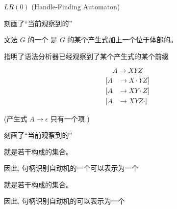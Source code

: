 \begin{frame}{}
  \begin{center}
    $LR(0)$  (Handle-Finding Automaton)

    \vspace{0.10cm}
  \end{center}
\end{frame}

\begin{frame}{}
  \begin{center}
    刻画了``当前观察到的''
  \end{center}

  \begin{definition}[$LR(0)$项 (Item)]
    文法 $G$ 的一个 是 $G$ 的某个产生式加上一个位于体部的。
  \end{definition}

  \begin{center}
    指明了语法分析器已经观察到了某个产生式的某个前缀

    \pause
    \[
      A \to XYZ
    \]
    \begin{align*}
      [A &\to \cdot XYZ] \\[6pt]
      [A &\to X \cdot YZ] \\[6pt]
      [A &\to XY \cdot Z] \\[6pt]
      [A &\to XYZ \cdot]
    \end{align*}

    (产生式 $A \to \epsilon$ 只有一个项 \blue{$[A \to \cdot]$})
  \end{center}
\end{frame}

\begin{frame}{}
  \begin{center}
    刻画了``当前观察到的''

    \begin{definition}[项集]
      就是若干构成的集合。
    \end{definition}

    \vspace{0.30cm}
    因此, 句柄识别自动机的一个可以表示为一个

    \pause
    \vspace{0.60cm}
    \begin{definition}[项集族]
      就是若干构成的集合。
    \end{definition}

    \vspace{0.30cm}
    因此, 句柄识别自动机的可以表示为一个
  \end{center}
\end{frame}


